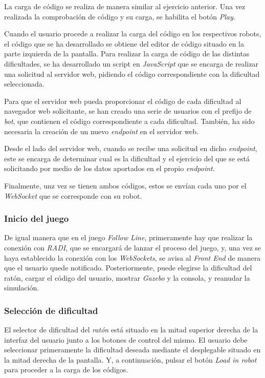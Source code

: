 \documentclass[a4paper, 12pt]{book}
\begin{document}
La carga de código se realiza de manera similar al ejercicio anterior. Una vez realizada la comprobación de código y su carga, se habilita el botón \emph{Play}.

Cuando el usuario procede a realizar la carga del código en los respectivos robots, el código que se ha desarrollado
se obtiene del editor de código situado en la parte izquierda de la pantalla. Para realizar la carga de código de las distintas dificultades, se ha desarrollado un script en \emph{JavaScript} que se encarga de realizar una solicitud al servidor web, pidiendo el código correspondiente con la dificultad seleccionada.

Para que el servidor web pueda proporcionar el código de cada dificultad al navegador web solicitante, se han creado una serie de usuarios con el prefijo de \emph{bot}, que contienen el código correspondiente a cada dificultad. También, ha sido necesaria la creación de un nuevo \emph{endpoint} en el servidor web.

Desde el lado del servidor web, cuando se recibe una solicitud en dicho \emph{endpoint}, este se encarga de determinar cual es la dificultad y el ejercicio del que se está solicitando por medio de los datos aportados en el propio \emph{endpoint}.

Finalmente, unz vez se tienen ambos códigos, estos se envían cada uno por el \emph{WebSocket} que se corresponde con su robot.

\subsubsection{Inicio del juego}
\label{drone_cat_mouse_inicio}

De igual manera que en el juego \emph{Follow Line}, primeramente hay que realizar la conexión con \emph{RADI}, que se encargará de lanzar el proceso del juego, y, una vez se haya establecido la conexión con los \emph{WebSockets}, se avisa al \emph{Front End} de manera que el usuario quede notificado. Posteriormente, puede elegirse la dificultad del ratón, cargar el código del usuario, mostrar \emph{Gazebo} y la consola,  y reanudar la simulación.

\subsubsection{Selección de dificultad}
\label{drone_cat_mouse_difficulty}

El selector de dificultad del \emph{ratón} está situado en la mitad superior derecha de la interfaz del usuario junto a los botones de control del mismo. El usuario debe seleccionar primeramente la dificultad deseada mediante el desplegable situado en la mitad derecha de la pantalla. Y, a continuación, pulsar el botón \emph{Load in robot} para proceder a la carga de los códigos.
\end{document}

